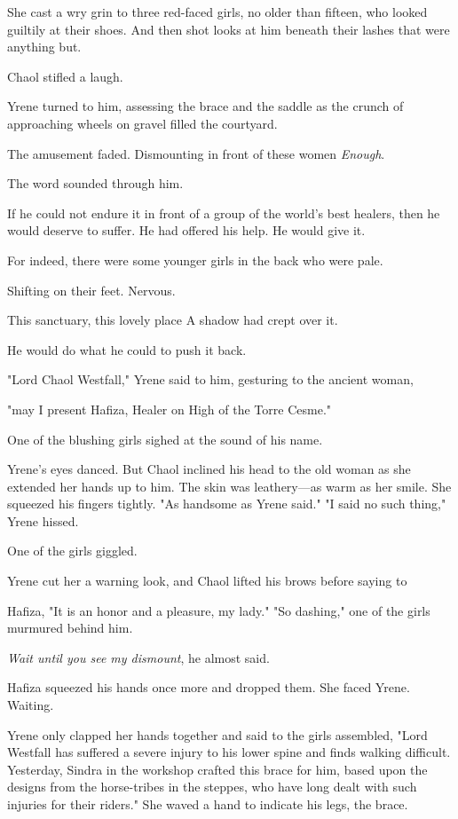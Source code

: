 She cast a wry grin to three red-faced girls, no older than fifteen, who looked guiltily at their shoes. And then shot looks at him beneath their lashes that were anything but.

Chaol stifled a laugh.

Yrene turned to him, assessing the brace and the saddle as the crunch of approaching wheels on gravel filled the courtyard.

The amusement faded. Dismounting in front of these women 
\emph{Enough}.

The word sounded through him.

If he could not endure it in front of a group of the world's best healers, then he would deserve to suffer. He had offered his help. He would give it.

For indeed, there were some younger girls in the back who were pale.

Shifting on their feet. Nervous.

This sanctuary, this lovely place  A shadow had crept over it.

He would do what he could to push it back.

"Lord Chaol Westfall," Yrene said to him, gesturing to the ancient woman,

"may I present Hafiza, Healer on High of the Torre Cesme."

One of the blushing girls sighed at the sound of his name.

Yrene's eyes danced. But Chaol inclined his head to the old woman as she extended her hands up to him. The skin was leathery---as warm as her smile. She squeezed his fingers tightly. "As handsome as Yrene said." "I said no such thing," Yrene hissed.

One of the girls giggled.

Yrene cut her a warning look, and Chaol lifted his brows before saying to

Hafiza, "It is an honor and a pleasure, my lady." "So dashing," one of the girls murmured behind him.

\emph{Wait until you see my dismount}, he almost said.

Hafiza squeezed his hands once more and dropped them. She faced Yrene. Waiting.

Yrene only clapped her hands together and said to the girls assembled, "Lord Westfall has suffered a severe injury to his lower spine and finds walking difficult. Yesterday, Sindra in the workshop crafted this brace for him, based upon the designs from the horse-tribes in the steppes, who have long dealt with such injuries for their riders." She waved a hand to indicate his legs, the brace.


